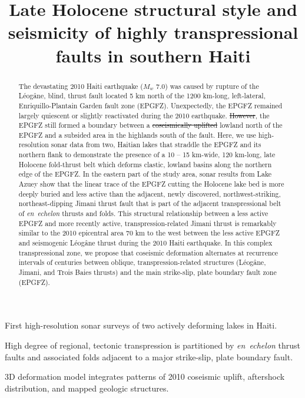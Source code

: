 \documentclass[linenumbers,draft]{agujournal}
\providecommand{\DIFaddtex}[1]{{\protect\color{blue}\uwave{#1}}} %
\providecommand{\DIFdeltex}[1]{{\protect\color{red}\sout{#1}}}                      %
\providecommand{\DIFaddbegin}{} %
\providecommand{\DIFaddend}{} %
\providecommand{\DIFdelbegin}{} %
\providecommand{\DIFdelend}{} %
\providecommand{\DIFadd}[1]{\texorpdfstring{\DIFaddtex{#1}}{#1}} %
\providecommand{\DIFdel}[1]{\texorpdfstring{\DIFdeltex{#1}}{}} %
\begin{document}
\title{Late Holocene structural style and seismicity of highly transpressional faults in southern Haiti}



\begin{keypoints}
\item First high-resolution sonar surveys of two actively deforming lakes in Haiti.
\item High degree of regional, tectonic transpression is partitioned by \textit{en~echelon} thrust faults and associated folds adjacent to a major strike-slip, plate boundary fault.
\item 3D deformation model integrates patterns of 2010 coseismic uplift, aftershock distribution, and mapped geologic structures.
\end{keypoints}

\begin{abstract}
The devastating 2010 Haiti earthquake ($M_w$ 7.0) was caused by rupture of the L\'eog\^ane, blind, thrust fault located 5 km north of the 1200 km-long, left-lateral, Enriquillo-Plantain Garden fault zone (EPGFZ). Unexpectedly, the EPGFZ remained largely quiescent or slightly reactivated during the 2010 earthquake. \DIFdelbegin \DIFdel{However}\DIFdelend \DIFaddbegin \DIFadd{Nevertheless}\DIFaddend , the EPGFZ still formed a \DIFaddbegin \DIFadd{major, crustal }\DIFaddend boundary between a \DIFdelbegin \DIFdel{coseismically uplifted }\DIFdelend \DIFaddbegin \DIFadd{coseismically-uplifted }\DIFaddend lowland north of the EPGFZ and a subsided area in the highlands south of the fault. Here, we use high-resolution sonar data from two, Haitian lakes that straddle the EPGFZ and its northern flank to demonstrate the presence of a 10 -- 15 km-wide, 120 km-long, late Holocene fold-thrust belt which deforms clastic, lowland basins along the northern edge of the EPGFZ. In the eastern part of the study area, sonar results from Lake Azuey show that the linear trace of the EPGFZ cutting the Holocene lake bed is more deeply buried and less active than the adjacent, newly discovered, northwest-striking, northeast-dipping Jimani thrust fault that is part of the adjacent transpressional belt of \textit{en~echelon} thrusts and folds. This structural relationship between a less active EPGFZ and more recently active, transpression-related Jimani thrust is remarkably similar to the 2010 epicentral area 70 km to the west between the less active EPGFZ and seismogenic L\'eog\^ane thrust during the 2010 Haiti earthquake. In this complex transpressional zone, we propose that coseismic deformation alternates at recurrence intervals of centuries between oblique, transpression-related structures (L\'eog\^ane, Jimani, and Trois Baies thrusts) and the main strike-slip, plate boundary fault zone (EPGFZ).
\end{abstract}
\end{document}
